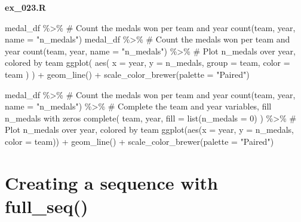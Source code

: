 \documentclass[
  letterpaper,
  DIV=11,
  numbers=noendperiod]{scrreprt}
\newenvironment{Shaded}{\begin{snugshade}}{\end{snugshade}}
\newcommand{\AttributeTok}[1]{\textcolor[rgb]{0.40,0.45,0.13}{#1}}
\newcommand{\CommentTok}[1]{\textcolor[rgb]{0.37,0.37,0.37}{#1}}
\newcommand{\DecValTok}[1]{\textcolor[rgb]{0.68,0.00,0.00}{#1}}
\newcommand{\FunctionTok}[1]{\textcolor[rgb]{0.28,0.35,0.67}{#1}}
\newcommand{\NormalTok}[1]{\textcolor[rgb]{0.00,0.23,0.31}{#1}}
\newcommand{\SpecialCharTok}[1]{\textcolor[rgb]{0.37,0.37,0.37}{#1}}
\newcommand{\StringTok}[1]{\textcolor[rgb]{0.13,0.47,0.30}{#1}}
\begin{document}
\textbf{ex\_023.R}

\begin{Shaded}
\begin{Highlighting}[]
\NormalTok{medal\_df }\SpecialCharTok{\%\textgreater{}\%} 
  \CommentTok{\# Count the medals won per team and year}
  \FunctionTok{count}\NormalTok{(team, year, }\AttributeTok{name =} \StringTok{"n\_medals"}\NormalTok{)}
\NormalTok{medal\_df }\SpecialCharTok{\%\textgreater{}\%} 
  \CommentTok{\# Count the medals won per team and year}
  \FunctionTok{count}\NormalTok{(team, year, }\AttributeTok{name =} \StringTok{"n\_medals"}\NormalTok{) }\SpecialCharTok{\%\textgreater{}\%} 
  \CommentTok{\# Plot n\_medals over year, colored by team}
  \FunctionTok{ggplot}\NormalTok{(}
    \FunctionTok{aes}\NormalTok{(}
      \AttributeTok{x =}\NormalTok{ year,}
      \AttributeTok{y =}\NormalTok{ n\_medals,}
      \AttributeTok{group =}\NormalTok{ team,}
      \AttributeTok{color =}\NormalTok{ team}
\NormalTok{    )}
\NormalTok{  ) }\SpecialCharTok{+}
  \FunctionTok{geom\_line}\NormalTok{() }\SpecialCharTok{+}
  \FunctionTok{scale\_color\_brewer}\NormalTok{(}\AttributeTok{palette =} \StringTok{"Paired"}\NormalTok{)}

\NormalTok{medal\_df }\SpecialCharTok{\%\textgreater{}\%} 
  \CommentTok{\# Count the medals won per team and year}
  \FunctionTok{count}\NormalTok{(team, year, }\AttributeTok{name =} \StringTok{"n\_medals"}\NormalTok{) }\SpecialCharTok{\%\textgreater{}\%} 
  \CommentTok{\# Complete the team and year variables, fill n\_medals with zeros}
  \FunctionTok{complete}\NormalTok{(}
\NormalTok{    team,}
\NormalTok{    year,}
    \AttributeTok{fill =} \FunctionTok{list}\NormalTok{(}\AttributeTok{n\_medals =} \DecValTok{0}\NormalTok{)}
\NormalTok{  ) }\SpecialCharTok{\%\textgreater{}\%} 
  \CommentTok{\# Plot n\_medals over year, colored by team}
  \FunctionTok{ggplot}\NormalTok{(}\FunctionTok{aes}\NormalTok{(}\AttributeTok{x =}\NormalTok{ year, }\AttributeTok{y =}\NormalTok{ n\_medals, }\AttributeTok{color =}\NormalTok{ team)) }\SpecialCharTok{+}
  \FunctionTok{geom\_line}\NormalTok{() }\SpecialCharTok{+}
  \FunctionTok{scale\_color\_brewer}\NormalTok{(}\AttributeTok{palette =} \StringTok{"Paired"}\NormalTok{)}
\end{Highlighting}
\end{Shaded}

\hypertarget{creating-a-sequence-with-full_seq}{%
\section{Creating a sequence with
full\_seq()}\label{creating-a-sequence-with-full_seq}}
\end{document}
